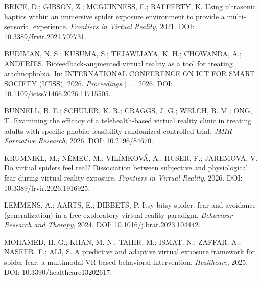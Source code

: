 BRICE, D.; GIBSON, Z.; MCGUINNESS, F.; RAFFERTY, K. Using ultrasonic
haptics within an immersive spider exposure environment to provide a
multi-sensorial experience. \textit{Frontiers in Virtual Reality}, 2021.
DOI: 10.3389/frvir.2021.707731.

BUDIMAN, N. S.; KUSUMA, S.; TEJAWIJAYA, K. H.; CHOWANDA, A.; ANDERIES.
Biofeedback-augmented virtual reality as a tool for treating
arachnophobia. In: INTERNATIONAL CONFERENCE ON ICT FOR SMART SOCIETY
(ICISS), 2026. \textit{Proceedings} [...]. 2026.
DOI: 10.1109/iciss71466.2026.11715505.

BUNNELL, B. E.; SCHULER, K. R.; CRAGGS, J. G.; WELCH, B. M.; ONG, T.
Examining the efficacy of a telehealth-based virtual reality clinic in
treating adults with specific phobia: feasibility randomized controlled
trial. \textit{JMIR Formative Research}, 2026. DOI: 10.2196/84670.

KRUMNIKL, M.; NĚMEC, M.; VILÍMKOVÁ, A.; HUSER, F.; JAREMOVÁ, V. Do
virtual spiders feel real? Dissociation between subjective and
physiological fear during virtual reality exposure. \textit{Frontiers in
Virtual Reality}, 2026. DOI: 10.3389/frvir.2026.1916925.

LEMMENS, A.; AARTS, E.; DIBBETS, P. Itsy bitsy spider: fear and
avoidance (generalization) in a free-exploratory virtual reality
paradigm. \textit{Behaviour Research and Therapy}, 2024.
DOI: 10.1016/j.brat.2023.104442.

MOHAMED, H. G.; KHAN, M. N.; TAHIR, M.; ISMAT, N.; ZAFFAR, A.; NASEER,
F.; ALI, S. A predictive and adaptive virtual exposure framework for
spider fear: a multimodal VR-based behavioral intervention.
\textit{Healthcare}, 2025. DOI: 10.3390/healthcare13202617.

%
%
%

\endgroup
